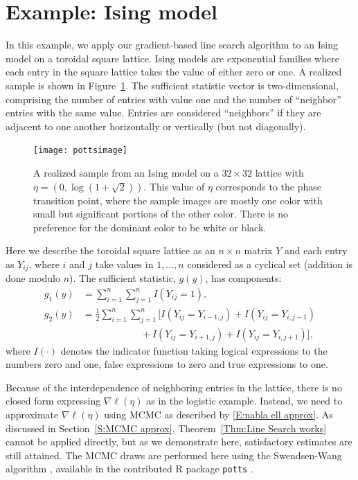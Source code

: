 \section{Example: Ising model} \label{S:Example:Ising}
In this example, we apply our gradient-based line search algorithm to an Ising model 
\citep{Ising} on a toroidal square 
lattice.  Ising models are exponential families where each entry in the square lattice 
takes the value of either zero 
or one.  A realized sample is shown in Figure~\ref{F:pottsimage}.  The sufficient 
statistic vector is two-dimensional, 
comprising the number of entries with value one and the number of ``neighbor'' entries 
with the same value.  Entries are 
considered ``neighbors'' if they are adjacent to one another horizontally or 
vertically (but not diagonally).  
\begin{figure}[h!]
\begin{center}
\texttt{[image: pottsimage]}
\end{center}
\caption[A realized sample from an Ising model on a $32 \times 32$ lattice with 
$\eta$ at phase transition value.]
{A realized sample from an Ising model on a $32 \times 32$ lattice with 
$\eta = \left(0, \log(1 + \sqrt{2}) \right)$.  This value of $\eta$ corresponds to the phase transition point, where 
the sample images are mostly one 
color with small but significant portions of the other color.  There is no preference 
for the dominant color to be 
white or black.}
\label{F:pottsimage}
\end{figure}

Here we describe the toroidal square lattice as an $n \times n$ matrix $Y$ and each 
entry as $Y_{ij}$, where $i$ and $j
$ take values in $1, \ldots, n$ considered as a cyclical set (addition is done modulo 
$n$).  The sufficient statistic, 
$g(y)$, has components:
\begin{align*}
	g_1(y) &= \sum_{i=1}^n \sum_{j=1}^n I(Y_{ij}=1), \\
	g_2(y) &= \frac{1}{2} \sum_{i=1}^n \sum_{j=1}^n 
			\bigl[ I(Y_{ij}=Y_{i-1,j}) + I(Y_{ij}=Y_{i,j-1}) \\
			&\qquad \qquad \qquad + I(Y_{ij}=Y_{i+1,j}) + I(Y_{ij}=Y_{i,j+1}) \bigr ],
\end{align*}  
where $I(\cdot)$ denotes the indicator function taking logical expressions to the 
numbers zero and one, false 
expressions to zero and true expressions to one.  

Because of the interdependence of neighboring entries in the lattice, there is no 
closed form expressing $\nabla \ell( \eta)$ as in the logistic example.  
Instead, we need to approximate $\nabla \ell( \eta)$ using MCMC as described by 
\eqref{E:nabla ell approx}.  As discussed in Section~\ref{S:MCMC approx}, 
Theorem~\ref{Thm:Line Search works} 
cannot be applied directly, but as we demonstrate here, satisfactory estimates are 
still attained.  The MCMC draws are 
performed here using the Swendsen-Wang algorithm 
\citep{Swendsen-Wang:1987,Swendsen-Wang:1990}, available in the contributed R 
package \texttt{potts} \citep{Geyer:potts}.

